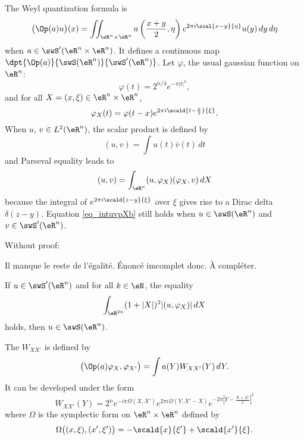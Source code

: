 The Weyl quantization formula is
\begin{equation}
	\big( \Op(a)u \big)(x)=\iint_{\eR^n\times\eR^n} a\left( \frac{ x+y }{ 2 },\eta \right) e^{2\pi i\scal{ x-y }{ \eta }}u(y)\,dy\,d\eta
\end{equation}
when $a\in\swS'(\eR^n\times\eR^n)$. It defines a continuous map $\dpt{ \Op(a)  }{ \swS(\eR^n) }{ \swS'(\eR^n) }$. Let $\varphi$, the usual gaussian function on $\eR^n$:
\[
	\varphi(t)=2^{n/4} e^{-\pi| t |^2},
\]
and for all $X=(x,\xi)\in\eR^n\times\eR^n$,
\[
	\varphi_X(t)=\varphi(t-x) e^{2\pi i\scald{ t-\frac{ x }{2} }{ \xi }}.
\]
When $u$, $v\in L^2(\eR^n)$, the scalar product is defined by
\begin{equation}
	(u,v)=\int u(t)\overline{ v }(t)\,dt
\end{equation}
and Parseval equality leads to
\begin{equation}  \label{eq_intuvpXb}
	(u,v)=\int_{\eR^n}(u,\varphi_X)(\varphi_X,v)\,dX
\end{equation}
because the integral of $ e^{2\pi i\scald{ z-y }{ \xi }}$ over $\xi$ gives rise to a Dirac delta $\delta(z-y)$. Equation \eqref{eq_intuvpXb} still holds when $u\in\swS(\eR^n)$ and $v\in\swS'(\eR^n)$.

Without proof:
\begin{probleme}
	Il manque le reste de l'égalité. Énoncé imcomplet donc. À compléter.
\end{probleme}

\begin{proposition}
	If $u\in\swS'(\eR^n)$ and for all $k\in\eN$, the equality
	\[
		\int_{\eR^{2n}} (1+| X |)^2 | (u,\varphi_X) |\,dX
	\]
	holds, then $u\in\swS(\eR^n)$.
\end{proposition}

The  $W_{XX'}$ is defined by
\begin{equation}
	\big( \Op(a)\varphi_X,\varphi_{X'} \big)=\int a(Y)W_{XX'}(Y)\,dY.
\end{equation}
It can be developed under the form
\begin{equation}
	W_{XX'}(Y)=2^n e^{-i\pi\Omega(X,X')} e^{2\pi i\Omega(Y,X'-X)} e^{-2\pi\left|  Y-\frac{ X+X' }{ 2 }  \right|^2}
\end{equation}
where $\Omega$ is the symplectic form on $\eR^n\times\eR^n$ defined by
\[
	\Omega\big( (x,\xi),(x',\xi') \big)=-\scald{ x }{ \xi' }+\scald{ x' }{ \xi }.
\]

